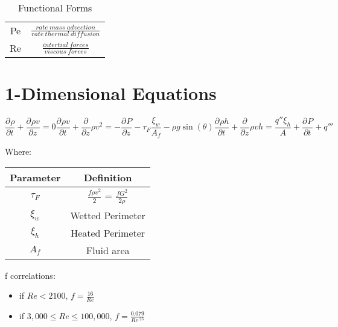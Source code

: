 \documentclass{article}
\begin{document}
\begin{table}[!h!]
    \centering
    \renewcommand{\arraystretch}{1.5}
    \begin{tabular}{|c|c|}
        \hline
         Pe & $\frac{rate\ mass\ advection}{rate\ thermal\ diffusion }$  \\
         Re & $\frac{intertial\ forces}{viscous\ forces}$ \\
         \hline
    \end{tabular}
    \caption{Functional Forms}
    \label{funcform}
\end{table}
\newcommand{\pd}[3]{\frac{\partial^{#3}#1}{\partial{#2}^{#3}}}
\section{1-Dimensional Equations}
\begin{subequations}
    \begin{equation}
        \pd{\rho}{t}{} + \pd{\rho v}{z}{} = 0
        \label{mass}
    \end{equation}
    \begin{equation}
        \pd{\rho v}{t}{} + \pd{}{z}{}\rho v^2 = -\pd{P}{z}{}-\tau_F\frac{\xi_w}{A_f} - \rho g \sin(\theta)
        \label{momentum}
    \end{equation}
    \begin{equation}
        \pd{\rho h}{t}{} + \pd{}{z}{}\rho v h = \frac{q''\xi_h}{A}+\pd{P}{t}{} + q'''
        \label{energy}
    \end{equation}
\end{subequations}

Where: 
\begin{table}[!h!]
    \centering
    \renewcommand{\arraystretch}{1.5}
    \begin{tabular}{c|c}
         Parameter & Definition \\
         \midrule
         $\tau_F$ & $\frac{f\rho v^2}{2}$ = $\frac{fG^2}{2\rho}$\\
         \hline
         $\xi_w$ & Wetted Perimeter\\
         \hline
         $\xi_h$ & Heated Perimeter\\
         \hline
         $A_f$ & Fluid area \\
         \hline
    \end{tabular}
    \label{tab:my_label}
\end{table}

f correlations:

\begin{itemize}
    \item if $Re<2100$, $ f = \frac{16}{Re}$
    \item if $3,000 \leq Re\leq 100,000 $,  $f = \frac{0.079}{Re^{.25}}$
\end{itemize}
\end{document}
